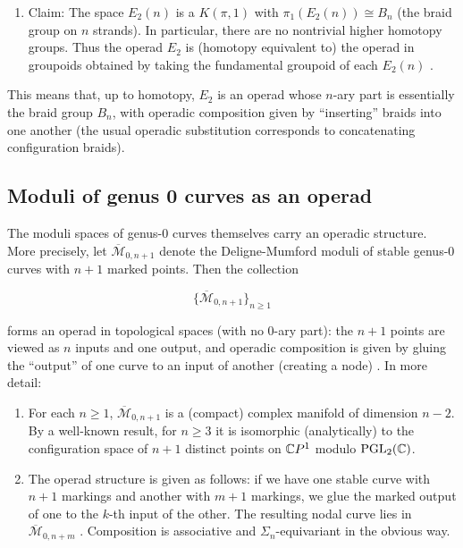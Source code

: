 \begin{enumerate}
    \item Claim: The space $E_2(n)$ is a $K(\pi,1)$ with $\pi_1(E_2(n))\cong B_n$ (the braid group on $n$ strands).  In particular, there are no nontrivial higher homotopy groups.  Thus the operad $E_2$ is (homotopy equivalent to) the operad in groupoids obtained by taking the fundamental groupoid of each $E_2(n)$ \cite{C_2014}.
\end{enumerate}

This means that, up to homotopy, $E_2$ is an operad whose $n$-ary part is essentially the braid group $B_n$, with operadic composition given by “inserting” braids into one another (the usual operadic substitution corresponds to concatenating configuration braids).

\subsection{Moduli of genus 0 curves as an operad}

The moduli spaces of genus-0 curves themselves carry an operadic structure.  More precisely, let $\overline{\mathcal{M}}_{0,n+1}$ denote the Deligne-Mumford moduli of stable genus-0 curves with $n+1$ marked points.  Then the collection

$$
  \{\overline{\mathcal{M}}_{0,n+1}\}_{n\ge1}
$$

forms an operad in topological spaces (with no $0$-ary part): the $n+1$ points are viewed as $n$ inputs and one output, and operadic composition is given by gluing the “output” of one curve to an input of another (creating a node) \cite{de_brito_operads_2019}. In more detail:

\begin{enumerate}
    \item For each $n\ge1$, $\overline{\mathcal{M}}_{0,n+1}$ is a (compact) complex manifold of dimension $n-2$.  By a well-known result, for $n\ge3$ it is isomorphic (analytically) to the configuration space of $n+1$ distinct points on $\mathbb{C} P^1$ modulo $\mathrm{PGL}_2(\mathbb{C})$.
    \item The operad structure is given as follows: if we have one stable curve with $n+1$ markings and another with $m+1$ markings, we glue the marked output of one to the $k$-th input of the other.  The resulting nodal curve lies in $\overline{\mathcal{M}}_{0,n+m}$ \cite{de_brito_operads_2019}. Composition is associative and $\Sigma_n$-equivariant in the obvious way.
\end{enumerate}

